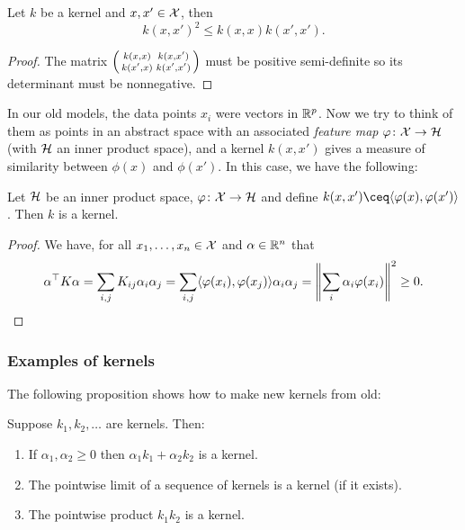 \begin{proposition} \label{prop:kernel_cs}
    Let $k$ be a kernel and $x, x' \in \mathcal X$, then 
    \[
    k(x, x')^2 \leq k(x, x) k(x', x'). 
    \]
\end{proposition}

\begin{proof}
    The matrix $\smqty(k(x, x) & k(x, x') \\ k(x', x) & k(x', x'))$ must be positive semi-definite so its determinant must be non\-negative. 
\end{proof}

In our old models, the data points $x_i$ were vectors in $\mathbb R^p$. Now we try to think of them as points in an abstract space with an associated \emph{feature map} $\varphi \colon \mathcal X \to \mathcal H$ (with $\mathcal H$ an inner product space), and a kernel $k(x, x')$ gives a measure of similarity between $\phi(x)$ and $\phi(x')$. In this case, we have the following: 
\begin{proposition} \label{prop:ip_kernel}
    Let $\mathcal H$ be an inner product space,  $\varphi \colon \mathcal X \to \mathcal H$ and define $k(x, x') \ceq \ang{\phi(x), \phi(x')}$. Then $k$ is a kernel. 
\end{proposition}

\begin{proof}
    We have, for all $x_1, \dotsc, x_n \in \mathcal X$ and $\alpha \in \mathbb R^n$ that
    \[
    \alpha^\top K \alpha = \sum_{i, j} K_{ij} \alpha_i \alpha_j = \sum_{i, j} \langle\varphi(x_i), \varphi(x_j)\rangle \alpha_i \alpha_j = \norm{\sum_i \alpha_i \varphi(x_i)}^2 \geq 0. 
    \]
\end{proof}

\subsubsection{Examples of kernels}
The following proposition shows how to make new kernels from old:
\begin{proposition}
    Suppose $k_1, k_2, \dotsc$ are kernels. Then:
    \begin{enumerate}
        \item If $\alpha_1, \alpha_2 \geq 0$ then $\alpha_1 k_1 + \alpha_2 k_2$ is a kernel.
        \item The pointwise limit of a sequence of kernels is a kernel (if it exists). 
        \item The pointwise product $k_1 k_2$ is a kernel. 
    \end{enumerate}
\end{proposition}

